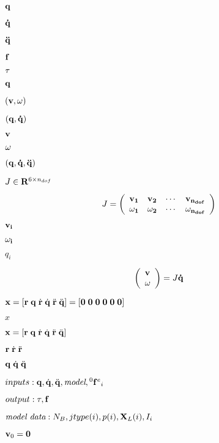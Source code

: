\documentclass{article}
\begin{document}
${\bf q}$
\pagebreak

${\bf \dot{q}}$
\pagebreak

${\bf \ddot{q}}$
\pagebreak

${\bf f}$
\pagebreak

${\bf \tau }$
\pagebreak

${\bf {q}}$
\pagebreak

$({\bf v}, {\bf \omega})$
\pagebreak

$({\bf q},{\bf \dot{q}})$
\pagebreak

${\bf v}$
\pagebreak

${\bf \omega}$
\pagebreak

$({\bf q},{\bf \dot{q}}, {\bf \ddot{q}})$
\pagebreak

$J \in {\bf R}^{6\times n_{dof}}$
\pagebreak

\[ J = \left(\begin{array}{llll} {\bf v_1} & {\bf v_2} & \cdots & {\bf v_{n_{dof}}} \\ {\bf \omega_1} & {\bf \omega_2} & \cdots & {\bf \omega_{n_{dof}}} \end{array}\right) \]
\pagebreak

${\bf v_i}$
\pagebreak

${\bf \omega_i}$
\pagebreak

$q_i$
\pagebreak

\[ \left(\begin{array}{l} {\bf v} \\ {\bf \omega}\end{array}\right) = J {\bf \dot{q}} \]
\pagebreak

$ {\bf x} = [{\bf r} \; {\bf q} \; \dot{\bf r} \; \dot{\bf q} \; \ddot{\bf r} \; \ddot{\bf q}]= [{\bf 0} \; {\bf 0} \; {\bf 0} \; {\bf 0} \; {\bf 0} \; {\bf 0}]$
\pagebreak

$x$
\pagebreak

$ {\bf x} = [{\bf r} \; {\bf q} \; \dot{\bf r} \; \dot{\bf q} \; \ddot{\bf r} \; \ddot{\bf q}]$
\pagebreak

$ {\bf r} \; \dot{\bf r} \; \ddot{\bf r}$
\pagebreak

$ {\bf q} \; \dot{\bf q} \; \ddot{\bf q}$
\pagebreak

$inputs: {\bf q},\dot{\bf q}, \ddot{\bf q}, \textit{model}, {^0{\bf f}{^e}{_i}}$
\pagebreak

$output: \tau, {\bf f} $
\pagebreak

$\textit{model data}: N_B, jtype(i), p(i), {\bf X}_L(i), I_i $
\pagebreak

${\bf v}_0 = {\bf 0}$
\pagebreak
\end{document}
